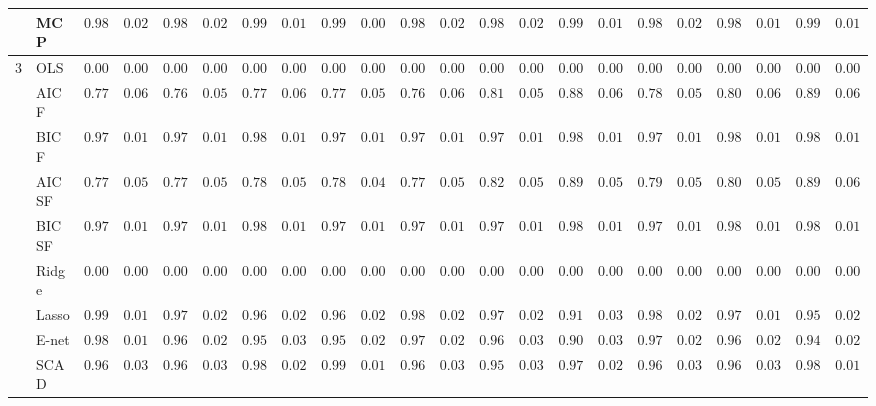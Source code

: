 \begin{tabular}{p{0.2cm}p{1cm}|p{0.6cm}p{0.6cm}|p{0.6cm}p{0.6cm}p{0.6cm}p{0.6cm}p{0.6cm}p{0.6cm}|p{0.6cm}p{0.6cm}p{0.6cm}p{0.6cm}p{0.6cm}p{0.6cm}|p{0.6cm}p{0.6cm}p{0.6cm}p{0.6cm}p{0.6cm}p{0.6cm}}
 & MCP  & $0.9866$ & $0.0200$ & $0.9861$ & $0.0229$ & $0.9942$ & $0.0116$ & $0.9980$ & $0.0055$ & $0.9839$ & $0.0254$ & $0.9856$ & $0.0224$ & $0.9907$ & $0.0159$ & $0.9873$ & $0.0226$ & $0.9858$ & $0.0162$ & $0.9909$ & $0.0150$ \\\hline
3 & OLS  & $0.0000$ & $0.0000$ & $0.0000$ & $0.0000$ & $0.0000$ & $0.0000$ & $0.0000$ & $0.0000$ & $0.0000$ & $0.0000$ & $0.0000$ & $0.0000$ & $0.0000$ & $0.0000$ & $0.0000$ & $0.0000$ & $0.0000$ & $0.0000$ & $0.0000$ & $0.0000$ \\
 & AIC F  & $0.7760$ & $0.0636$ & $0.7662$ & $0.0549$ & $0.7760$ & $0.0629$ & $0.7783$ & $0.0557$ & $0.7682$ & $0.0619$ & $0.8160$ & $0.0554$ & $0.8895$ & $0.0673$ & $0.7869$ & $0.0525$ & $0.8017$ & $0.0635$ & $0.8929$ & $0.0670$ \\
 & BIC F  & $0.9732$ & $0.0155$ & $0.9789$ & $0.0179$ & $0.9805$ & $0.0177$ & $0.9783$ & $0.0150$ & $0.9760$ & $0.0174$ & $0.9793$ & $0.0139$ & $0.9889$ & $0.0121$ & $0.9786$ & $0.0155$ & $0.9833$ & $0.0159$ & $0.9896$ & $0.0121$ \\
 & AIC SF  & $0.7794$ & $0.0571$ & $0.7708$ & $0.0567$ & $0.7851$ & $0.0555$ & $0.7829$ & $0.0488$ & $0.7784$ & $0.0559$ & $0.8212$ & $0.0542$ & $0.8971$ & $0.0589$ & $0.7919$ & $0.0528$ & $0.8065$ & $0.0589$ & $0.8974$ & $0.0603$ \\
 & BIC SF  & $0.9736$ & $0.0148$ & $0.9791$ & $0.0174$ & $0.9807$ & $0.0175$ & $0.9782$ & $0.0151$ & $0.9760$ & $0.0174$ & $0.9795$ & $0.0137$ & $0.9890$ & $0.0122$ & $0.9786$ & $0.0156$ & $0.9834$ & $0.0157$ & $0.9896$ & $0.0121$ \\
 & Ridge  & $0.0000$ & $0.0000$ & $0.0000$ & $0.0000$ & $0.0000$ & $0.0000$ & $0.0000$ & $0.0000$ & $0.0000$ & $0.0000$ & $0.0000$ & $0.0000$ & $0.0000$ & $0.0000$ & $0.0000$ & $0.0000$ & $0.0000$ & $0.0000$ & $0.0000$ & $0.0000$ \\
 & Lasso  & $0.9900$ & $0.0144$ & $0.9769$ & $0.0245$ & $0.9694$ & $0.0268$ & $0.9690$ & $0.0243$ & $0.9864$ & $0.0226$ & $0.9774$ & $0.0291$ & $0.9120$ & $0.0362$ & $0.9833$ & $0.0209$ & $0.9719$ & $0.0193$ & $0.9556$ & $0.0236$ \\
 & E-net  & $0.9854$ & $0.0169$ & $0.9671$ & $0.0289$ & $0.9566$ & $0.0310$ & $0.9568$ & $0.0293$ & $0.9778$ & $0.0286$ & $0.9668$ & $0.0346$ & $0.9011$ & $0.0391$ & $0.9767$ & $0.0247$ & $0.9620$ & $0.0222$ & $0.9465$ & $0.0267$ \\
 & SCAD  & $0.9625$ & $0.0383$ & $0.9676$ & $0.0355$ & $0.9800$ & $0.0231$ & $0.9953$ & $0.0156$ & $0.9605$ & $0.0388$ & $0.9570$ & $0.0375$ & $0.9791$ & $0.0280$ & $0.9631$ & $0.0373$ & $0.9645$ & $0.0304$ & $0.9883$ & $0.0170$ \\

\end{tabular}

